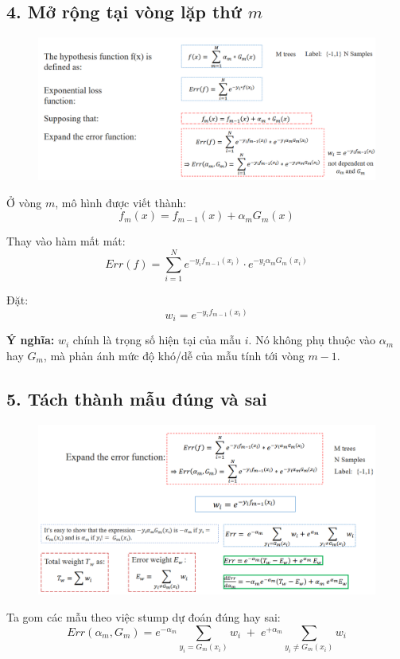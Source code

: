 \documentclass[11pt]{article}
\begin{document}
\subsection*{4. Mở rộng tại vòng lặp thứ $m$}

    \begin{figure}[H]
    \centering
    \includegraphics[width=0.7\linewidth]{images/math3.png}
    \end{figure}


Ở vòng \(m\), mô hình được viết thành:
\[
f_m(x) = f_{m-1}(x) + \alpha_m G_m(x)
\]

Thay vào hàm mất mát:
\[
Err(f) = \sum_{i=1}^N e^{-y_i f_{m-1}(x_i)} \cdot e^{-y_i \alpha_m G_m(x_i)}
\]

Đặt:
\[
w_i = e^{-y_i f_{m-1}(x_i)}
\]

\textbf{Ý nghĩa:} \(w_i\) chính là trọng số hiện tại của mẫu \(i\). Nó không phụ thuộc vào \(\alpha_m\) hay \(G_m\), mà phản ánh mức độ khó/dễ của mẫu tính tới vòng \(m-1\).


\subsection*{5. Tách thành mẫu đúng và sai}

    \begin{figure}[H]
    \centering
    \includegraphics[width=0.7\linewidth]{images/math4.png}
    \end{figure}

Ta gom các mẫu theo việc stump dự đoán đúng hay sai:
\[
Err(\alpha_m, G_m) = e^{-\alpha_m} \sum_{y_i = G_m(x_i)} w_i \;+\; e^{+\alpha_m} \sum_{y_i \neq G_m(x_i)} w_i
\]
\end{document}
